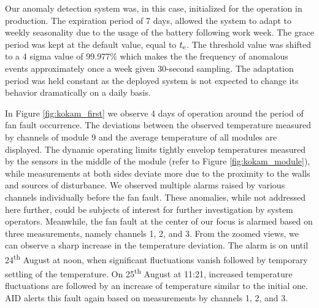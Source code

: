 Our anomaly detection system was, in this case, initialized for the operation in production. The expiration period of 7 days, allowed the system to adapt to weekly seasonality due to the usage of the battery following work week. The grace period was kept at the default value, equal to $t _{\text{e}}$. The threshold value was shifted to a 4 sigma value of 99.977\% which makes the the frequency of anomalous events approximately once a week given 30-second sampling. The adaptation period was held constant as the deployed system is not expected to change its behavior dramatically on a daily basis.

In Figure \ref{fig:kokam_first} we observe 4 days of operation around the period of fan fault occurrence. The deviations between the observed temperature measured by channels of module 9 and the average temperature of all modules are displayed. The dynamic operating limits tightly envelop temperatures measured by the sensors in the middle of the module (refer to Figure \ref{fig:kokam_module}), while measurements at both sides deviate more due to the proximity to the walls and sources of disturbance. We observed multiple alarms raised by various channels individually before the fan fault. These anomalies, while not addressed here further, could be subjects of interest for further investigation by system operators. Meanwhile, the fan fault at the center of our focus is alarmed based on three measurements, namely channels 1, 2, and 3. From the zoomed views, we can observe a sharp increase in the temperature deviation. The alarm is on until 24\textsuperscript{th} August at noon, when significant fluctuations vanish followed by temporary settling of the temperature. On 25\textsuperscript{th} August at 11:21, increased temperature fluctuations are followed by an increase of temperature similar to the initial one.
AID alerts this fault again based on measurements by channels 1, 2, and 3.

